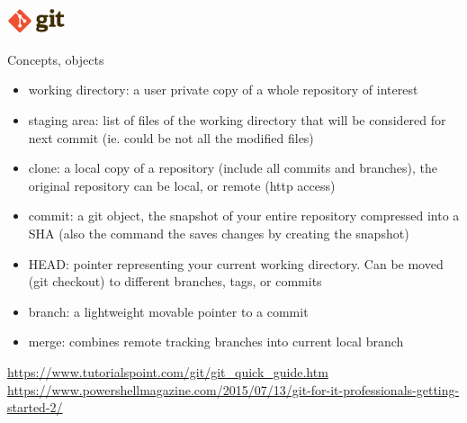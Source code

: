 \begin{frame}{\includegraphics[height=0.8cm]{shared/logo-git.png}}
\begin{block}{Concepts, objects}
\begin{itemize}
    \item working directory: a user private copy of a whole repository of interest
    \item staging area: list of files of the working directory that will be considered for next commit (ie. could be not all the modified files)
    \item clone: a local copy of a repository (include all commits and branches), the original repository can be local, or remote (http access)
    \item commit: a git object, the snapshot of your entire repository compressed into a SHA (also the command the saves changes by creating the snapshot)
    \item HEAD: pointer representing your current working directory. Can be moved (git checkout) to different branches, tags, or commits 
    \item branch: a lightweight movable pointer to a commit
    \item merge: combines remote tracking branches into current local branch
\end{itemize}
\end{block}
\tiny{
   \url{https://www.tutorialspoint.com/git/git_quick_guide.htm}\\
   \url{https://www.powershellmagazine.com/2015/07/13/git-for-it-professionals-getting-started-2/}
}
\end{frame}

